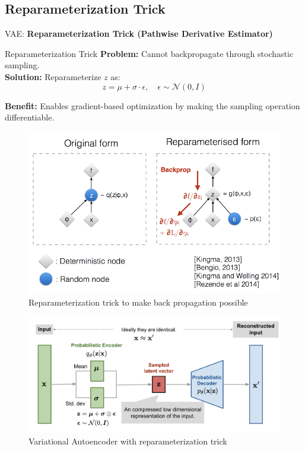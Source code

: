\subsection{Reparameterization Trick}
\begin{frame}{}
	\LARGE VAE: \textbf{Reparameterization Trick (Pathwise Derivative Estimator)}
\end{frame}

\begin{frame}[allowframebreaks]{Reparameterization Trick}
\textbf{Problem:} Cannot backpropagate through stochastic sampling.\\[1em]

\textbf{Solution:} Reparameterize $z$ as:
\[
z = \mu + \sigma \cdot \epsilon, \quad \epsilon \sim \mathcal{N}(0, I)
\]

\textbf{Benefit:} Enables gradient-based optimization by making the sampling operation differentiable.

\framebreak

\begin{figure}
	\centering
	\includegraphics[height=0.8\textheight, width=\textwidth, keepaspectratio]{images/vae/reparam_trick.png}
	\caption*{Reparameterization trick to make back propagation possible}
\end{figure}

\framebreak

\begin{figure}
	\centering
	\includegraphics[height=0.8\textheight, width=\textwidth, keepaspectratio]{images/vae/reparam_trick_network.png}
	\caption*{Variational Autoencoder with reparameterization trick}
\end{figure}
\end{frame}

